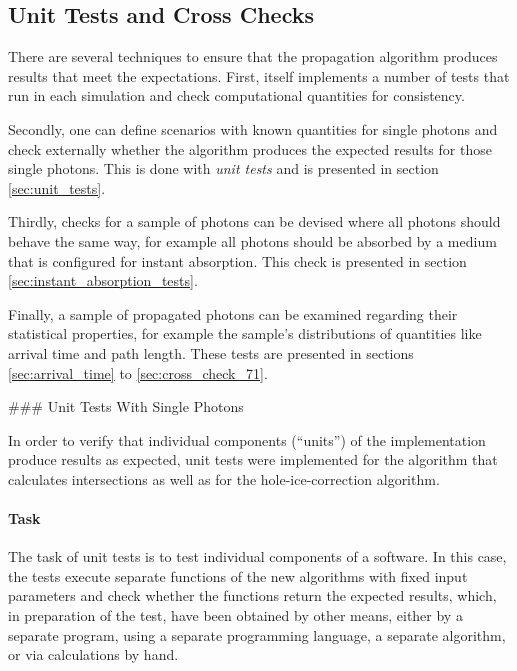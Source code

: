 
\subsection{Unit Tests and Cross Checks}
\label{sec:unit_tests_and_cross_checks}

There are several techniques to ensure that the propagation algorithm produces results that meet the expectations. First, \clsim itself implements a number of tests that run in each simulation and check computational quantities for consistency. \cite{clsimsource}

Secondly, one can define scenarios with known quantities for single photons and check externally whether the algorithm produces the expected results for those single photons. This is done with \textit{unit tests} and is presented in section \ref{sec:unit_tests}.

Thirdly, checks for a sample of photons can be devised where all photons should behave the same way, for example all photons should be absorbed by a medium that is configured for instant absorption. This check is presented in section \ref{sec:instant_absorption_tests}.

Finally, a sample of propagated photons can be examined regarding their statistical properties, for example the sample's distributions of quantities like arrival time and path length. These tests are presented in sections \ref{sec:arrival_time} to \ref{sec:cross_check_71}.


### Unit Tests With Single Photons
\label{sec:unit_tests}

In order to verify that individual components (``units'') of the implementation produce results as expected, unit tests were implemented for the algorithm that calculates intersections as well as for the hole-ice-correction algorithm.


\paragraph{Task} The task of unit tests is to test individual components of a software. In this case, the tests execute separate functions of the new algorithms with fixed input parameters and check whether the functions return the expected results, which, in preparation of the test, have been obtained by other means, either by a separate program, using a separate programming language, a separate algorithm, or via calculations by hand.

